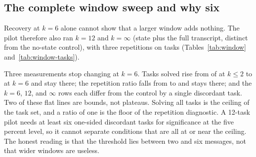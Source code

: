 

\subsection{The complete window sweep and why six}
Recovery at $k=6$ alone cannot show that a larger window adds nothing.
The pilot therefore also ran $k=12$ and $k=\infty$ (state plus the full
transcript, distinct from the no-state control), with three repetitions
on \WindowTaskCount{} tasks (Tables~\ref{tab:window}
and~\ref{tab:window-tasks}).

\begin{table}[htbp]
\centering\small
\caption{Window pilot in the standard two panels (finalized medians over
three repetitions). Per-execution solved rates, efficiencies, pooled cost
ratios, and input counters were not retained (--). Cache hit is the
reported pilot value, not reconstructed from counters.}
\label{tab:window}
\resizebox{\linewidth}{!}{}

\medskip
\resizebox{\linewidth}{!}{}
\end{table}

\begin{table}[htbp]
\centering\small
\caption{Window pilot outcomes reported in the research log (raw sessions
unavailable). A task counts as solved if any of its three repetitions
passed. Discordant tasks and exact McNemar $p$ compare with full history.
Output per turn is the reported median.}
\label{tab:window-tasks}
\resizebox{\linewidth}{!}{}
\end{table}

Three measurements stop changing at $k=6$. Tasks solved rise from
\WindowStateTasksSolved{} of \WindowTaskCount{} at $k\leq2$ to
\WindowSixTasksSolved{} at $k=6$ and stay there; the repetition ratio
falls from \WindowStateRepetition{} to \WindowSixRepetition{} and stays
there; and the $k=6$, $12$, and $\infty$ rows each differ from the control
by a single discordant task. Two of these flat lines are bounds, not
plateaus. Solving all \WindowTaskCount{} tasks is the ceiling of the
task set, and a ratio of one is the floor of the repetition diagnostic. A 12-task pilot
needs at least six one-sided discordant tasks for significance at the five percent level, so it cannot
separate conditions that are all at or near the ceiling. The honest
reading is that the threshold lies between two and six messages, not that
wider windows are useless.

